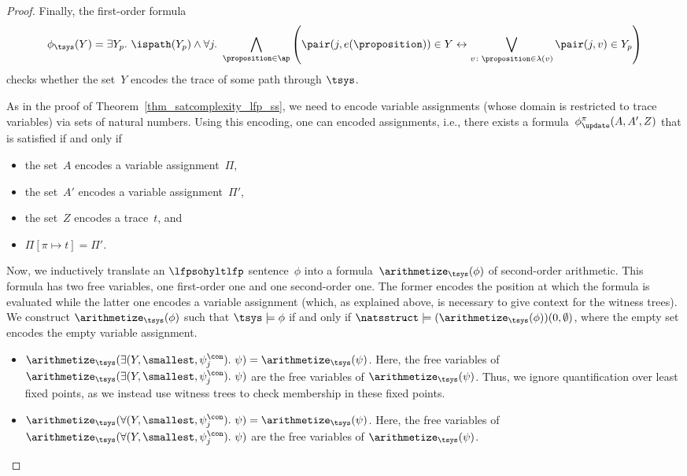 \begin{proof}
Finally, the first-order formula
\[
\phi_{\tsys}(Y) = \exists Y_p.\ \ispath(Y_p) \wedge \forall j.\ \bigwedge_{\proposition\in\ap} \left( \pair(j,e(\proposition))\in Y \leftrightarrow \bigvee_{v\colon \proposition \in \lambda(v)} \pair(j,v) \in Y_p\right)
\]
checks whether the set~$Y$ encodes the trace of some path through $\tsys$.

As in the proof of Theorem~\ref{thm_satcomplexity_lfp_ss}, we need to encode variable assignments (whose domain is restricted to trace variables) via sets of natural numbers. 
Using this encoding, one can  encoded assignments, i.e., there exists a formula~$\phi_{\update}^\pi(A,A',Z)$ that is satisfied if and only if
\begin{itemize}
    \item the set~$A$ encodes a variable assignment~$\Pi$,
    \item the set~$A'$ encodes a variable assignment~$\Pi'$,
    \item the set~$Z$ encodes a trace~$t$, and
    \item $\Pi[\pi\mapsto t] = \Pi'$.
\end{itemize}

Now, we inductively translate an $\lfpsohyltlfp$ sentence~$\phi$ into a formula~$\arithmetize_\tsys(\phi)$ of second-order arithmetic.
This formula has two free variables, one first-order one and one second-order one.
The former encodes the position at which the formula is evaluated while the latter one encodes a variable assignment (which, as explained above, is necessary to give context for the witness trees).  
We construct $\arithmetize_\tsys(\phi)$ such that 
$\tsys \models \phi$ if and only if $\natsstruct\models (\arithmetize_\tsys(\phi))(0,\emptyset)$, where the empty set encodes the empty variable assignment.

\begin{itemize}
    
    \item $\arithmetize_\tsys(\exists (Y,\smallest,\psi_j^\con).\ \psi) = \arithmetize_\tsys(\psi)$. Here, the free variables of $\arithmetize_\tsys(\exists (Y,\smallest,\psi_j^\con).\ \psi)$ are the free variables of $\arithmetize_\tsys(\psi)$. Thus, we ignore quantification over least fixed points, as we instead use witness trees to check membership in these fixed points.
    
    \item $\arithmetize_\tsys(\forall (Y,\smallest,\psi_j^\con).\ \psi) = \arithmetize_\tsys(\psi)$. Here, the free variables of $\arithmetize_\tsys(\forall (Y,\smallest,\psi_j^\con).\ \psi)$ are the free variables of $\arithmetize_\tsys(\psi)$. 
    

\end{itemize}
\end{proof}
